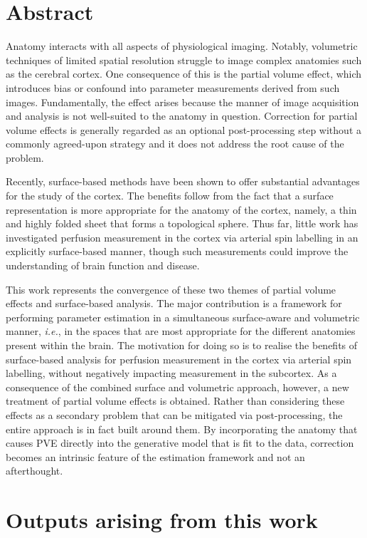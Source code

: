 \clearpage
\chapter*{Abstract}

Anatomy interacts with all aspects of physiological imaging. Notably, volumetric techniques of limited spatial resolution struggle to image complex anatomies such as the cerebral cortex. One consequence of this is the partial volume effect, which introduces bias or confound into parameter measurements derived from such images. Fundamentally, the effect arises because the manner of image acquisition and analysis is not well-suited to the anatomy in question. Correction for partial volume effects is generally regarded as an optional post-processing step without a commonly agreed-upon strategy and it does not address the root cause of the problem. 

Recently, surface-based methods have been shown to offer substantial advantages for the study of the cortex. The benefits follow from the fact that a surface representation is more appropriate for the anatomy of the cortex, namely, a thin and highly folded sheet that forms a topological sphere. Thus far, little work has investigated perfusion measurement in the cortex via arterial spin labelling in an explicitly surface-based manner, though such measurements could improve the understanding of brain function and disease. 

This work represents the convergence of these two themes of partial volume effects and surface-based analysis. The major contribution is a framework for performing parameter estimation in a simultaneous surface-aware and volumetric manner, \textit{i.e.}, in the spaces that are most appropriate for the different anatomies present within the brain. The motivation for doing so is to realise the benefits of surface-based analysis for perfusion measurement in the cortex via arterial spin labelling, without negatively impacting measurement in the subcortex. As a consequence of the combined surface and volumetric approach, however, a new treatment of partial volume effects is obtained. Rather than considering these effects as a secondary problem that can be mitigated via post-processing, the entire approach is in fact built around them. By incorporating the anatomy that causes PVE directly into the generative model that is fit to the data, correction becomes an intrinsic feature of the estimation framework and not an afterthought. 

\chapter*{Outputs arising from this work}

